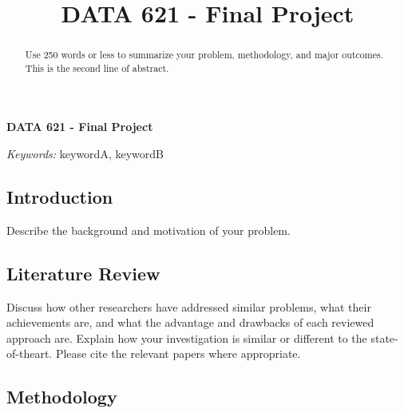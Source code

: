 \documentclass[12pt]{article}
\newcommand{\blind}{}
\begin{document}
\def\spacingset#1{\renewcommand{\baselinestretch}%
{#1}\small\normalsize} \spacingset{1}



\blind
{
  \title{\bf DATA 621 - Final Project}

  \author{
      }
  \maketitle
} \fi

\blind
{
  \bigskip
  \bigskip
  \bigskip
  \begin{center}
    {\LARGE\bf DATA 621 - Final Project}
  \end{center}
  \medskip
} \fi

\bigskip
\begin{abstract}
Use 250 words or less to summarize your problem, methodology, and major
outcomes. \newline This is the second line of abstract.
\end{abstract}

\noindent%
{\it Keywords:} keywordA, keywordB
\vfill

\newpage
\spacingset{1.45} %

\hypertarget{introduction}{%
\subsection{Introduction}\label{introduction}}

Describe the background and motivation of your problem.

\hypertarget{literature-review}{%
\subsection{Literature Review}\label{literature-review}}

Discuss how other researchers have addressed similar problems, what
their achievements are, and what the advantage and drawbacks of each
reviewed approach are. Explain how your investigation is similar or
different to the state-of-theart. Please cite the relevant papers where
appropriate.

\hypertarget{methodology}{%
\subsection{Methodology}\label{methodology}}
\end{document}
